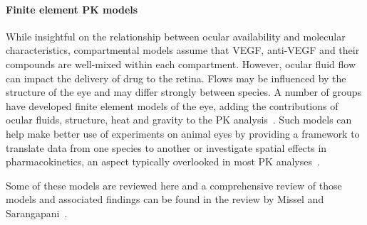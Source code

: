 \documentclass{article}
\begin{document}


\paragraph*{Finite element PK models}

While insightful on the relationship between ocular availability and molecular characteristics, compartmental models assume that VEGF, anti-VEGF and their compounds are well-mixed within each compartment.
However, ocular fluid flow can impact the delivery of drug to the retina.
Flows may be influenced by the structure of the eye and may differ strongly between species.
A number of groups have developed finite element models of the eye, adding the contributions of ocular fluids, structure, heat and gravity to the PK analysis~\cite{Lamminsalo_2018, Missel_2012, Zhang_2018}.
Such models can help make better use of experiments on animal eyes by providing a framework to translate data from one species to another or investigate spatial effects in pharmacokinetics, an aspect typically overlooked in most PK analyses~\cite{Bakri_2007, Caruso_2020, HuttonSmith_2016,HuttonSmith_2017,HuttonSmith_2018, Kaiser_2019, Park_2015, Park_2016, Xu_2013}.

Some of these models are reviewed here and a comprehensive review of those models and associated findings can be found in the review by Missel and Sarangapani~\cite{Missel_2019}.
\end{document}
